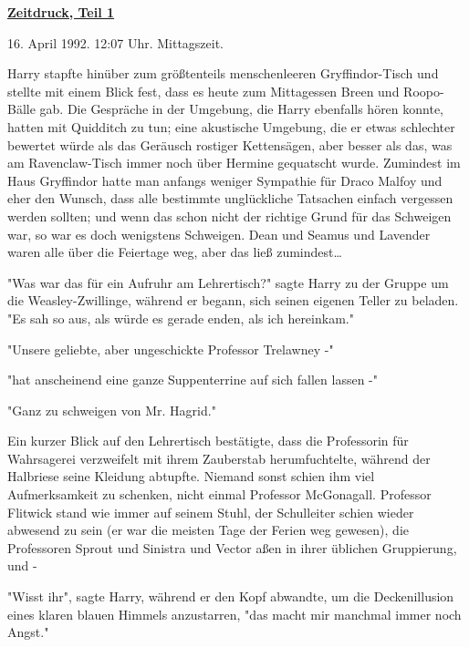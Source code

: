 

\hypertarget{zeitdruck-teil-1}{%

\textbf{\uline{Zeitdruck, Teil 1}}

16. April 1992. 12:07 Uhr. Mittagszeit.

Harry stapfte hinüber zum größtenteils menschenleeren Gryffindor-Tisch und stellte mit einem Blick fest, dass es heute zum Mittagessen Breen und Roopo-Bälle gab. Die Gespräche in der Umgebung, die Harry ebenfalls hören konnte, hatten mit Quidditch zu tun; eine akustische Umgebung, die er etwas schlechter bewertet würde als das Geräusch rostiger Kettensägen, aber besser als das, was am Ravenclaw-Tisch immer noch über Hermine gequatscht wurde. Zumindest im Haus Gryffindor hatte man anfangs weniger Sympathie für Draco Malfoy und eher den Wunsch, dass alle bestimmte unglückliche Tatsachen einfach vergessen werden sollten; und wenn das schon nicht der richtige Grund für das Schweigen war, so war es doch wenigstens Schweigen. Dean und Seamus und Lavender waren alle über die Feiertage weg, aber das ließ zumindest…

"Was war das für ein Aufruhr am Lehrertisch?" sagte Harry zu der Gruppe um die Weasley-Zwillinge, während er begann, sich seinen eigenen Teller zu beladen. "Es sah so aus, als würde es gerade enden, als ich hereinkam."

"Unsere geliebte, aber ungeschickte Professor Trelawney -"

"hat anscheinend eine ganze Suppenterrine auf sich fallen lassen -"

"Ganz zu schweigen von Mr. Hagrid."

Ein kurzer Blick auf den Lehrertisch bestätigte, dass die Professorin für Wahrsagerei verzweifelt mit ihrem Zauberstab herumfuchtelte, während der Halbriese seine Kleidung abtupfte. Niemand sonst schien ihm viel Aufmerksamkeit zu schenken, nicht einmal Professor McGonagall. Professor Flitwick stand wie immer auf seinem Stuhl, der Schulleiter schien wieder abwesend zu sein (er war die meisten Tage der Ferien weg gewesen), die Professoren Sprout und Sinistra und Vector aßen in ihrer üblichen Gruppierung, und -

"Wisst ihr", sagte Harry, während er den Kopf abwandte, um die Deckenillusion eines klaren blauen Himmels anzustarren, "das macht mir manchmal immer noch Angst."

}
